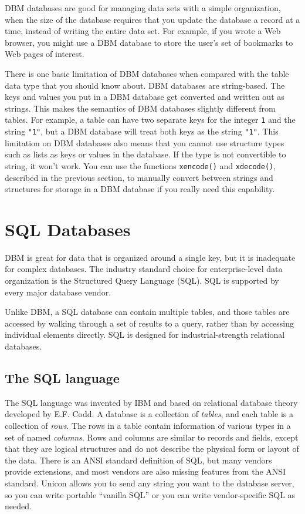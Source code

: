 DBM databases are good for managing data sets with a simple
organization, when the size of the database requires that you update
the database a record at a time, instead of writing the entire data
set. For example, if you wrote a Web browser, you might use a DBM
database to store the user's set of bookmarks to Web
pages of interest.

There is one basic limitation of DBM databases when compared with the
table data type that you should know about. DBM databases are
string-based. The keys and values you put in a DBM database get
converted and written out as strings. This makes the semantics of DBM
databases slightly different from tables. For example, a table can have
two separate keys for the integer \texttt{1} and the string
\texttt{"1"}, but a DBM database will treat
both keys as the string \texttt{"1"}. This
limitation on DBM databases also means that you cannot use structure
types such as lists as keys or values in the database. If the type is
not convertible to string, it won't work. You can use
the functions \texttt{xencode()} and \texttt{xdecode()}, described in
the previous section, to manually convert between strings and
structures for storage in a DBM database if you really need this
capability.

\section[SQL Databases]{SQL Databases}

DBM is great for data that is organized around a single
key, but it is inadequate for complex databases. The industry
standard choice for enterprise-level data organization is the
Structured Query Language (SQL). SQL is supported by every major
database vendor.

Unlike DBM, a SQL database can contain
multiple tables, and those tables are accessed by walking through a set
of results to a query, rather than by accessing individual elements
directly. SQL is designed for industrial-strength relational databases.

\subsection*{The SQL language}

The SQL language was invented by IBM and based on relational database
theory developed by E.F. Codd. A database is a collection of
\textit{tables}, and each table is a collection of \textit{rows}. The
rows in a table contain information of various types in a set of named
\textit{columns}. Rows and columns are similar to records and fields,
except that they are logical structures and do not describe the physical
form or layout of the data. There is an ANSI standard definition of
SQL, but many vendors provide extensions, and most vendors are also
missing features from the ANSI standard. Unicon allows you to send any
string you want to the database server, so you can write portable
``vanilla SQL'' or you can write vendor-specific SQL as needed.

